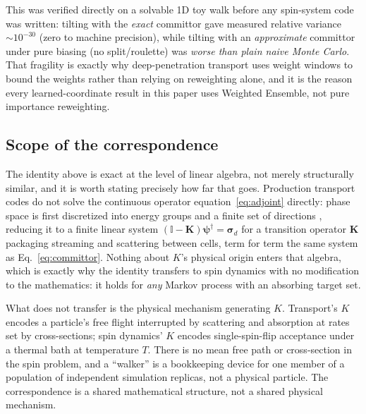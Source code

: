 \documentclass[11pt]{article}
\newcommand{\dg}{^{\dagger}}
\begin{document}
	This was verified directly on a solvable 1D toy walk before any spin-system code was
	written: tilting with the \emph{exact} committor gave measured relative variance
	$\sim\!10^{-30}$ (zero to machine precision), while tilting with an \emph{approximate}
	committor under pure biasing (no split/roulette) was \emph{worse than plain naive Monte
		Carlo}. That fragility is exactly why deep-penetration transport uses weight windows to
	bound the weights rather than relying on reweighting alone, and it is the reason every
	learned-coordinate result in this paper uses Weighted Ensemble, not pure importance
	reweighting.

	\subsection{Scope of the correspondence}
	\label{sec:scope}
	The identity above is exact at the level of linear algebra, not merely structurally
	similar, and it is worth stating precisely how far that goes. Production transport codes
	do not solve the continuous operator equation~\eqref{eq:adjoint} directly: phase space is
	first discretized into energy groups and a finite set of directions
	\cite{wagner1998, lewins1965}, reducing it to a finite linear system
	$(\mathbb I-\mathbf K)\boldsymbol\psi\dg=\boldsymbol\sigma_d$ for a transition operator
	$\mathbf K$ packaging streaming and scattering between cells, term for term the same
	system as Eq.~\eqref{eq:committor}. Nothing about $K$'s physical origin enters that algebra,
	which is exactly why the identity transfers to spin dynamics with no modification to the
	mathematics: it holds for \emph{any} Markov process with an absorbing target set.

	What does not transfer is the physical mechanism generating $K$. Transport's $K$ encodes a
	particle's free flight interrupted by scattering and absorption at rates set by
	cross-sections; spin dynamics' $K$ encodes single-spin-flip acceptance under a thermal bath
	at temperature $T$. There is no mean free path or cross-section in the spin problem, and a
	``walker'' is a bookkeeping device for one member of a population of independent
	simulation replicas, not a physical particle. The correspondence is a shared
	mathematical structure, not a shared physical mechanism.
\end{document}
